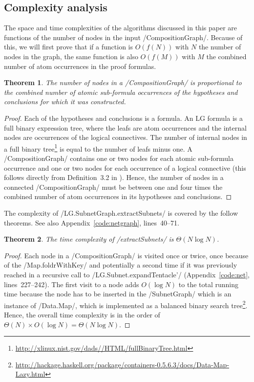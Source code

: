\documentclass[12pt,a4paper]{article}
\newtheorem{theorem}{Theorem}
\begin{document}
\subsection{Complexity analysis}

The space and time complexities of the algorithms discussed in this paper are functions of the number of nodes in the input \hs/CompositionGraph/. Because of this, we will first prove that if a function is $O(f(N))$ with $N$ the number of nodes in the graph, the same function is also $O(f(M))$ with $M$ the combined number of atom occurrences in the proof formulas.
\begin{theorem}\label{thm:nodes}
    The number of nodes in a \hs/CompositionGraph/ is proportional to the combined number of atomic sub-formula occurrences of the hypotheses and conclusions for which it was constructed.
\end{theorem}
\begin{proof}
    Each of the hypotheses and conclusions is a formula. An LG formula is a full binary expression tree, where the leafs are atom occurrences and the internal nodes are occurrences of the logical connectives. The number of internal nodes in a full binary tree\footnote{\url{http://xlinux.nist.gov/dads//HTML/fullBinaryTree.html}} is equal to the number of leafs minus one. A \hs/CompositionGraph/ contains one or two nodes for each atomic sub-formula occurrence and one or two nodes for each occurrence of a logical connective (this follows directly from Definition~3.2 in \cite[p.~23]{mm12}). Hence, the number of nodes in a connected \hs/CompositionGraph/ must be between one and four times the combined number of atom occurrences in its hypotheses and conclusions.
\end{proof}

The complexity of \hs/LG.SubnetGraph.extractSubnets/ is covered by the follow theorems. See also Appendix~\ref{code:netgraph}, lines~40--71.
\begin{theorem}\label{thm:netgraph-time}
    The time complexity of \hs/extractSubnets/ is $\Theta(N \log N)$.
\end{theorem}
\begin{proof}
    Each node in a \hs/CompositionGraph/ is visited once or twice, once because of the \hs/Map.foldrWithKey/ and potentially a second time if it was previously reached in a recursive call to \hs/LG.Subnet.expandTentacle'/ (Appendix~\ref{code:net}, lines~227--242). The first visit to a node adds $O(\log N)$ to the total running time because the node has to be inserted in the \hs/SubnetGraph/ which is an instance of \hs/Data.Map/, which is implemented as a balanced binary search tree\footnote{\url{http://hackage.haskell.org/package/containers-0.5.6.3/docs/Data-Map-Lazy.html}}. Hence, the overall time complexity is in the order of $\Theta(N)\times O(\log N) = \Theta(N\log N)$.
\end{proof}
\end{document}

